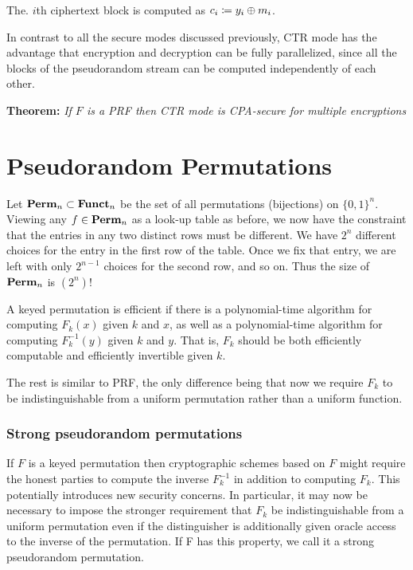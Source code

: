 \documentclass[12pt]{article}
\begin{document}
 The. $i$th ciphertext block is computed as $c_i \coloneqq y_i\oplus m_i$.
 
 In contrast to all the secure modes discussed previously, CTR mode has the advantage that encryption and decryption can be fully parallelized, since all the blocks of the pseudorandom stream can be computed independently of each other.
 
\textbf{Theorem:} \emph{If $F$ is a PRF then CTR mode is CPA-secure for multiple encryptions}

 \section{Pseudorandom Permutations}
 Let $\textbf{Perm}_n \subset \textbf{Funct}_n $ be the set of all permutations (bijections) on $\{0,1\}^n$. Viewing any $f \in \textbf{Perm}_n$ as a look-up table as before, we now have the constraint that the entries in any two distinct rows must be different. We have $2^n$ different choices for the entry in the first row of the table. Once we fix that entry, we are left with only $2^{n-1}$ choices for the second row, and so on. Thus the size of $\textbf{Perm}_n$ is $(2^n)!$
 
 A keyed permutation is efficient if there is a polynomial-time algorithm for computing $F_k(x)$ given $k$ and $x$, as well as a polynomial-time algorithm for computing $F_k^{-1}(y)$ given $k$ and $y$. That is, $F_k$ should be both efficiently computable and efficiently invertible given $k$.


 The rest is similar to PRF, the only diﬀerence being that now we require $F_k$ to be indistinguishable from
a uniform permutation rather than a uniform function.
 
\subsubsection{Strong pseudorandom permutations}
If $F$ is a keyed permutation then cryptographic schemes based on $F$ might require the honest parties to compute the inverse $F_k^{-1}$ in addition to computing $F_k$. This potentially introduces new security concerns. In particular, it may now be necessary to impose the stronger requirement that $F_k$ be indistinguishable from a uniform permutation even if the distinguisher is additionally given oracle access to
the inverse of the permutation. If F has this property, we call it a strong pseudorandom permutation.
 
 
 
 
 
 
 
 
 
 
 
\end{document}
